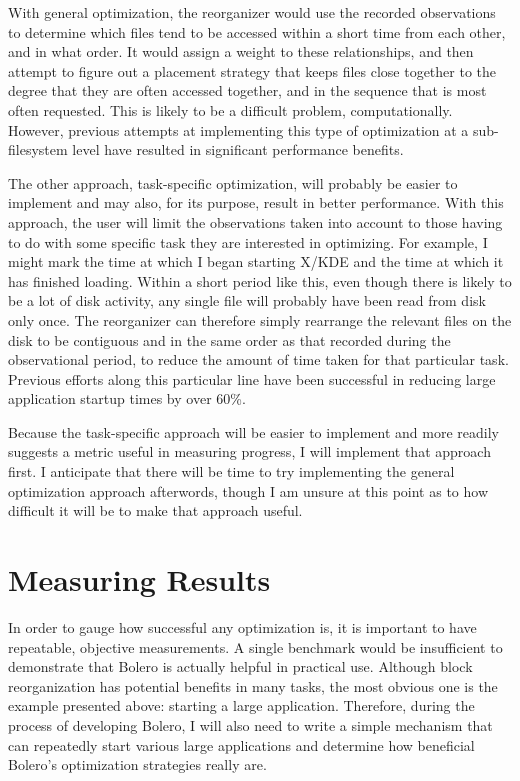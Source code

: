 \documentclass[10pt]{article}
\begin{document}
With general optimization, the reorganizer would use the recorded observations
to determine which files tend to be accessed within a short time from each
other, and in what order. It would assign a weight to these relationships, and then
attempt to figure out a placement strategy that keeps files close together to
the degree that they are often accessed together, and in the sequence that is
most often requested. This is likely to be a difficult problem, computationally.
However, previous attempts at implementing this type of optimization at a
sub-filesystem level have resulted in significant performance benefits\cite{autolocality}.

The other approach, task-specific optimization, will probably be easier to
implement and may also, for its purpose, result in better performance. With this
approach, the user will limit the observations taken into account to those having to
do with some specific task they are interested in optimizing. For example,
I might mark the time at which I began starting X/KDE and the time at
which it has finished loading. Within a short period like this, even
though there is likely to be a lot of disk activity, any single file will
probably have been read from disk only once. The reorganizer can therefore simply
rearrange the relevant files on the disk to be contiguous and in the same order as that
recorded during the observational period, to reduce the amount of time taken for
that particular task. Previous efforts along this particular line have been
successful in reducing large application startup times by over 60\%\cite{ala}.

Because the task-specific approach will be easier to implement and more readily
suggests a metric useful in measuring progress, I will implement that
approach first. I anticipate that there will be time to try implementing
the general optimization approach afterwords, though I am unsure at this point as to
how difficult it will be to make that approach useful.

\section{Measuring Results}

In order to gauge how successful any optimization is, it is important to have
repeatable, objective measurements. A single benchmark would be insufficient to demonstrate
that Bolero is actually helpful in practical use. Although block reorganization has
potential benefits in many tasks, the most obvious one is the example presented above:
starting a large application. Therefore, during the process of developing Bolero, I will
also need to write a simple mechanism that can repeatedly start various large applications
and determine how beneficial Bolero's optimization strategies really are.
\end{document}
